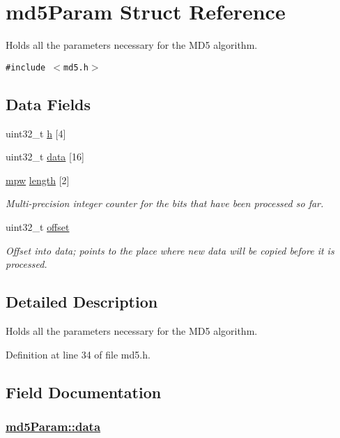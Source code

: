 \hypertarget{structmd5Param}{
\section{md5Param Struct Reference}
\label{structmd5Param}
}
Holds all the parameters necessary for the MD5 algorithm.  


{\tt \#include $<$md5.h$>$}

\subsection*{Data Fields}
\begin{CompactItemize}
\item 
uint32\_\-t \hyperlink{structmd5Param_o0}{h} \mbox{[}4\mbox{]}
\item 
uint32\_\-t \hyperlink{structmd5Param_o1}{data} \mbox{[}16\mbox{]}
\item 
\hyperlink{beecrypt_8api_8h_a9}{mpw} \hyperlink{structmd5Param_o2}{length} \mbox{[}2\mbox{]}
\begin{CompactList}\small\item\em Multi-precision integer counter for the bits that have been processed so far. \item\end{CompactList}\item 
uint32\_\-t \hyperlink{structmd5Param_o3}{offset}
\begin{CompactList}\small\item\em Offset into {\em data\/}; points to the place where new data will be copied before it is processed. \item\end{CompactList}\end{CompactItemize}


\subsection{Detailed Description}
Holds all the parameters necessary for the MD5 algorithm. 

Definition at line 34 of file md5.h.

\subsection{Field Documentation}
\hypertarget{structmd5Param_o1}{
\subsubsection[data]{\setlength{\rightskip}{0pt plus 5cm}\hyperlink{structmd5Param_o1}{md5Param::data}}}
\label{structmd5Param_o1}


